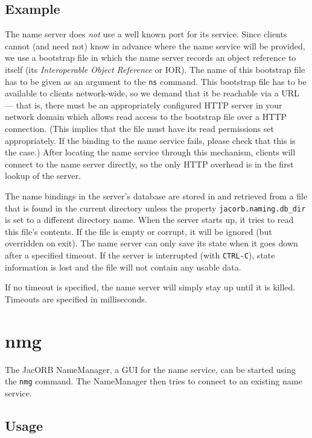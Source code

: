 \documentclass[12pt]{scrbook}
\begin{document}
\subsection*{Example}


The name server does {\it not}  use a well known port for its service.
Since clients  cannot (and  need not) know  in advance where  the name
service will  be provided, we use  a bootstrap file in  which the name
server records  an object reference to itself  (its {\it Interoperable
Object Reference} or  IOR). The name of this bootstrap  file has to be
given as an argument to the  {\tt ns} command. This bootstrap file has
to  be available  to clients  network-wide, so  we demand  that  it be
reachable  via a  URL  --- that  is,  there must  be an  appropriately
configured HTTP server in your network domain which allows read access
to the bootstrap  file over a HTTP connection.  (This implies that the
file must have its read  permissions set appropriately. If the binding
to the name service fails, please  check that this is the case.) After
locating the name service through this mechanism, clients will connect
to the name server directly, so the only HTTP overhead is in the first
lookup of the server.

The name bindings in the server's database are stored in and retrieved
from a file that is found in the current directory unless the property
{\tt jacorb.naming.db\_dir} is set to a different directory name. When
the server  starts up, it tries  to read this file's  contents. If the
file  is  empty or  corrupt,  it will  be  ignored  (but overridden  on
exit). The name server can only save its state when it goes down after
a specified timeout. If the server is interrupted (with {\tt CTRL-C}),
state information  is lost  and the file  will not contain  any usable
data.

If no timeout is specified, the name server will simply stay up until
it is killed. Timeouts are specified in milliseconds.

\section{nmg}

The JacORB  NameManager, a  GUI for the  name service, can  be started
using the {\tt nmg} command.  The NameManager then tries to connect to
an existing name service.

\subsection*{Usage}
\end{document}
